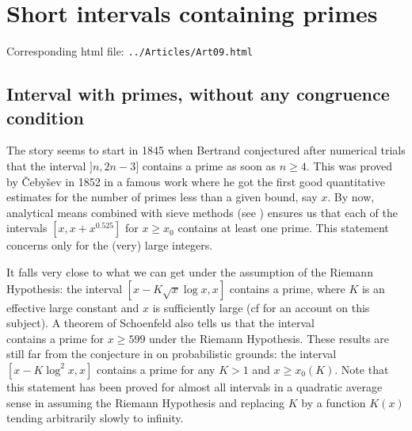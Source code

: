 \chapter{   Short intervals containing primes}

Corresponding html file: \texttt{../Articles/Art09.html}










 
 







\section{Interval with primes, without any congruence condition}




The story seems to start in 1845 when Bertrand conjectured after
numerical trials
that the interval $]n,2n-3]$ contains a prime as soon as $n\ge4$. This was proved
by \v Ceby\v sev in 1852 in a famous work where he got the first good
quantitative estimates for the number of primes less than a given bound,
say $x$. By now, analytical means combined with sieve methods
(see
\cite{Baker-Harman-Pintz*01}
)
ensures us that each of the
intervals $[x,x+x^{0.525}]$ for $x \geq x_0$
contains at least one prime.
This statement concerns only for the (very) large integers.

It falls very close to what we can get under the assumption
of the Riemann
Hypothesis: the interval $[x-K\sqrt{x}\log x,x]$ contains a prime, where
$K$ is an effective large constant and $x$ is sufficiently large
(cf
\cite{Wolke*83}
for an account on this subject). A theorem
of Schoenfeld
\cite{Schoenfeld*76}
also tells us that the interval
\begin{equation*}
  [x-\sqrt{x}\log^2x/(4\pi),x]
\end{equation*}
contains a prime for $x\geq 599$ under the Riemann Hypothesis. These results
are still far from the conjecture in
\cite{Cramer*36}
on
probabilistic grounds: the interval $[x-K\log^2x,x]$ contains a prime for any
$K > 1$ and $x\geq x_0(K)$. Note that this statement has been proved for almost
all intervals in a quadratic average sense in
\cite{Selberg*43}
assuming the Riemann Hypothesis and replacing $K$ by a function $K(x)$ tending
arbitrarily slowly to infinity.


